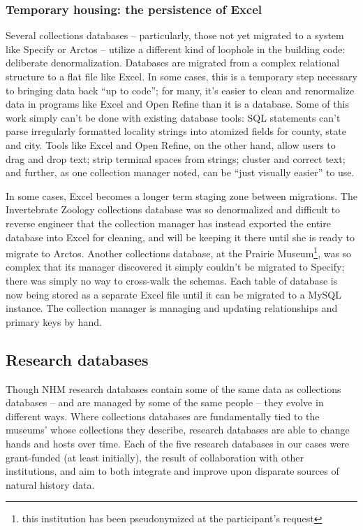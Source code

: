 \subsubsection{Temporary housing: the persistence of Excel}
Several collections databases -- particularly, those not yet migrated to a system like Specify or Arctos -- utilize a different kind of loophole in the building code: deliberate denormalization. Databases are migrated from a complex relational structure to a flat file like Excel. In some cases, this is a temporary step necessary to bringing data back “up to code”; for many, it's easier to clean and renormalize data in programs like Excel and Open Refine than it is a database. Some of this work simply can’t be done with existing database tools: SQL statements can’t parse irregularly formatted locality strings into atomized fields for county, state and city. Tools like Excel and Open Refine, on the other hand, allow users to drag and drop text; strip terminal spaces from strings; cluster and correct text; and further, as one collection manager noted, can be “just visually easier” to use.

In some cases, Excel becomes a longer term staging zone between migrations. The Invertebrate Zoology collections database was so denormalized and difficult to reverse engineer that the collection manager has instead exported the entire database into Excel for cleaning, and will be keeping it there until she is ready to migrate to Arctos. Another collections database, at the Prairie Museum\footnote{this institution has been pseudonymized at the participant's request}, was so complex that its manager discovered it simply couldn't be migrated to Specify; there was simply no way to cross-walk the schemas. Each table of database is now being stored as a separate Excel file until it can be migrated to a MySQL instance. The collection manager is managing and updating relationships and primary keys by hand. 

\subsection{ Research databases} 

Though NHM research databases contain some of the same data as collections databases -- and are managed by some of the same people -- they evolve in different ways. Where collections databases are fundamentally tied to the museums' whose collections they describe, research databases are able to change hands and hosts over time. Each of the five research databases in our cases were grant-funded (at least initially), the result of collaboration with other institutions, and aim to both integrate and improve upon disparate sources of natural history data. 


